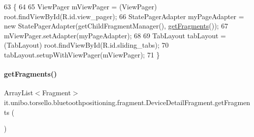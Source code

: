 \begin{DoxyCode}
63                                              \{
64 
65         ViewPager mViewPager = (ViewPager) root.findViewById(R.id.view\_pager);
66         StatePagerAdapter myPageAdapter = \textcolor{keyword}{new} StatePagerAdapter(getChildFragmentManager(), 
      \hyperlink{classit_1_1unibo_1_1torsello_1_1bluetoothpositioning_1_1fragment_1_1DeviceDetailFragment_a98e370cfcbfe5eaa4e1fe9242b00e639_a98e370cfcbfe5eaa4e1fe9242b00e639}{getFragments}());
67         mViewPager.setAdapter(myPageAdapter);
68 
69         TabLayout tabLayout = (TabLayout) root.findViewById(R.id.sliding\_tabs);
70         tabLayout.setupWithViewPager(mViewPager);
71     \}
\end{DoxyCode}
\hypertarget{classit_1_1unibo_1_1torsello_1_1bluetoothpositioning_1_1fragment_1_1DeviceDetailFragment_a98e370cfcbfe5eaa4e1fe9242b00e639_a98e370cfcbfe5eaa4e1fe9242b00e639}{}\label{classit_1_1unibo_1_1torsello_1_1bluetoothpositioning_1_1fragment_1_1DeviceDetailFragment_a98e370cfcbfe5eaa4e1fe9242b00e639_a98e370cfcbfe5eaa4e1fe9242b00e639} 
\paragraph{\texorpdfstring{get\+Fragments()}{getFragments()}}
{\footnotesize\ttfamily Array\+List$<$Fragment$>$ it.\+unibo.\+torsello.\+bluetoothpositioning.\+fragment.\+Device\+Detail\+Fragment.\+get\+Fragments (\begin{DoxyParamCaption}{ }\end{DoxyParamCaption})\hspace{0.3cm}{\ttfamily [private]}}


